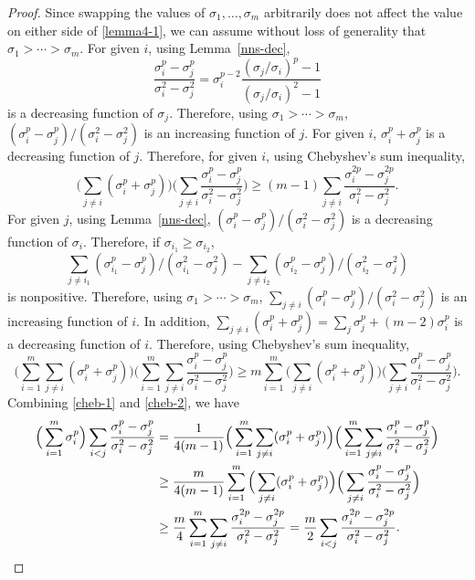 \documentclass[10pt,a4paper]{amsart}
\begin{document}
\begin{proof}
Since swapping the values of $\sigma_1, \ldots, \sigma_m$ arbitrarily does not affect the value on either side of \eqref{lemma4-1}, we can assume without loss of generality that $\sigma_1>\cdots>\sigma_m$.
For given $i$, using Lemma~\ref{nns-dec}, $$\frac{\sigma_i^p-\sigma_j^p}{\sigma_i^2-\sigma_j^2}=\sigma_i^{p-2}\frac{(\sigma_j/\sigma_i)^p-1}{(\sigma_j/\sigma_i)^2-1}$$ is a decreasing function of $\sigma_j$. Therefore, using $\sigma_1>\cdots>\sigma_m$, $(\sigma_i^p-\sigma_j^p)/(\sigma_i^2-\sigma_j^2)$ is an increasing function of $j$. For given $i$, $\sigma_i^p+\sigma_j^p$ is a decreasing function of $j$. Therefore, for given $i$, using Chebyshev's sum inequality, 
\begin{equation}
    \Big(\sum_{j\neq i}(\sigma_i^p+\sigma_j^p)\Big)\Big(\sum_{j\neq i}\frac{\sigma_i^p-\sigma_j^p}{\sigma_i^2-\sigma_j^2}\Big)\ge (m-1)\sum_{j\neq i}\frac{\sigma_i^{2p}-\sigma_j^{2p}}{\sigma_i^{2}-\sigma_j^2}. \label{cheb-1}
\end{equation} 
For given $j$, using Lemma~\ref{nns-dec}, $(\sigma_i^p-\sigma_j^p)/(\sigma_i^2-\sigma_j^2)$ is a decreasing function of $\sigma_i$. Therefore, if $\sigma_{i_1}\ge\sigma_{i_2}$, $$\sum_{j\neq i_1}(\sigma_{i_1}^p-\sigma_j^p)/(\sigma_{i_1}^2-\sigma_j^2)-\sum_{j\neq i_2}(\sigma_{i_2}^p-\sigma_j^p)/(\sigma_{i_2}^2-\sigma_j^2)$$ is nonpositive. Therefore, using $\sigma_1>\cdots>\sigma_m$, $\sum_{j\neq i}(\sigma_i^p-\sigma_j^p)/(\sigma_i^2-\sigma_j^2)$ is an increasing function of $i$. In addition, $\sum_{j\neq i}(\sigma_i^p+\sigma_j^p)=\sum_{j}\sigma_j^p+(m-2)\sigma_i^p$ is a decreasing function of $i$. Therefore, using Chebyshev's sum inequality,
\begin{equation}
    \Big(\sum_{i=1}^m\sum_{j\neq i}(\sigma_i^p+\sigma_j^p)\Big)\Big(\sum_{i=1}^m\sum_{j\neq i}\frac{\sigma_i^p-\sigma_j^p}{\sigma_i^2-\sigma_j^2}\Big) \ge m\sum_{i=1}^m\Big(\sum_{j\neq i}(\sigma_i^p+\sigma_j^p)\Big)\Big(\sum_{j\neq i}\frac{\sigma_i^p-\sigma_j^p}{\sigma_i^2-\sigma_j^2}\Big). \label{cheb-2}
\end{equation}
Combining \eqref{cheb-1} and \eqref{cheb-2}, we have
\begin{align*}
  \Big(\sum_{i=1}^m\sigma_i^p\Big)\sum_{i<j}\frac{\sigma_i^p-\sigma_j^p}{\sigma_i^2-\sigma_j^2}&= \frac{1}{4(m-1)}\Big(\sum_{i=1}^m\sum_{j\neq i}(\sigma_i^p+\sigma_j^p)\Big)\Big(\sum_{i=1}^m\sum_{j\neq i}\frac{\sigma_i^p-\sigma_j^p}{\sigma_i^2-\sigma_j^2}\Big) \notag\\
  &\ge \frac{m}{4(m-1)}\sum_{i=1}^m\Big(\sum_{j\neq i}(\sigma_i^p+\sigma_j^p)\Big)\Big(\sum_{j\neq i}\frac{\sigma_i^p-\sigma_j^p}{\sigma_i^2-\sigma_j^2}\Big)\notag\\
  &\ge \frac{m}{4}\sum_{i=1}^m\sum_{j\neq i}\frac{\sigma_i^{2p}-\sigma_j^{2p}}{\sigma_i^{2}-\sigma_j^2}=\frac{m}{2}\sum_{i<j}\frac{\sigma_i^{2p}-\sigma_j^{2p}}{\sigma_i^2-\sigma_j^2}.
\end{align*} 
\end{proof}
\end{document}
